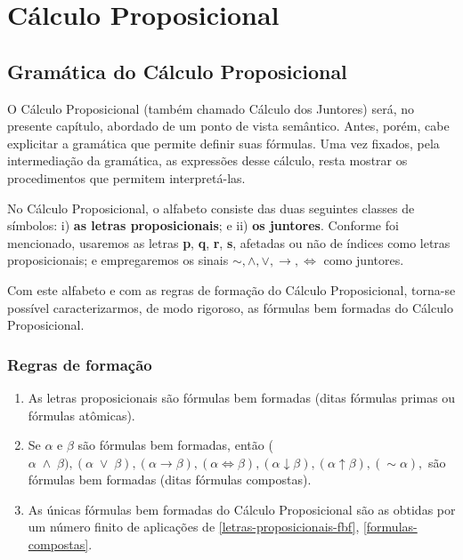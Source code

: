 \chapter{Cálculo Proposicional}

\section{Gramática do Cálculo Proposicional}

O Cálculo Proposicional (também chamado Cálculo dos Juntores) será, no presente capítulo, abordado de um ponto de vista semântico.
Antes, porém, cabe explicitar a gramática que permite definir suas fórmulas.
Uma vez fixados, pela intermediação da gramática, as expressões desse cálculo, resta mostrar os procedimentos que permitem interpretá-las.

No Cálculo Proposicional, o alfabeto consiste das duas seguintes classes de símbolos: i) \textbf{as letras proposicionais}; e ii) \textbf{os juntores}.
Conforme foi mencionado, usaremos as letras \textbf{p}, \textbf{q}, \textbf{r}, \textbf{s}, afetadas ou não de índices como letras proposicionais; e empregaremos os sinais $\sim, \land, \lor, \to, \iff$ como juntores.

Com este alfabeto e com as regras de formação do Cálculo Proposicional, torna-se possível caracterizarmos, de modo rigoroso, as fórmulas bem formadas do Cálculo Proposicional.

\subsection*{Regras de formação}

\begin{enumerate}[label={\roman*})]
    \item As letras proposicionais são fórmulas bem formadas (ditas fórmulas primas ou fórmulas atômicas). \label{letras-proposicionais-fbf}

    \item Se $\alpha$ e $\beta$ são fórmulas bem formadas, então ($\alpha \; \land \; \beta), (\alpha \; \lor \; \beta), (\alpha \to \beta), (\alpha \iff \beta), (\alpha \downarrow \beta), (\alpha \uparrow \beta), (\sim\alpha),$ são fórmulas bem formadas (ditas fórmulas compostas). \label{formulas-compostas}

    \item As únicas fórmulas bem formadas do Cálculo Proposicional são as obtidas por um número finito de aplicações de \ref{letras-proposicionais-fbf}, \ref{formulas-compostas}.
\end{enumerate}

